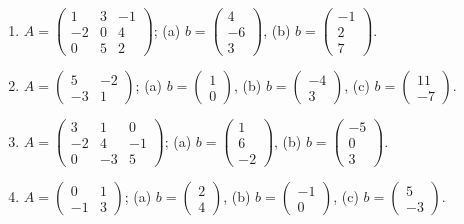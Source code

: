 \begin{enumerate}[label=\arabic*., leftmargin=*]
\item $A=\begin{pmatrix}1&3&-1\\-2&0&4\\0&5&2\end{pmatrix}$; \quad
(a) $b=\begin{pmatrix}4\\-6\\3\end{pmatrix}$, \quad
(b) $b=\begin{pmatrix}-1\\2\\7\end{pmatrix}$.

\item $A=\begin{pmatrix}5&-2\\-3&1\end{pmatrix}$; \quad
(a) $b=\begin{pmatrix}1\\0\end{pmatrix}$, \quad
(b) $b=\begin{pmatrix}-4\\3\end{pmatrix}$, \quad
(c) $b=\begin{pmatrix}11\\-7\end{pmatrix}$.

\item $A=\begin{pmatrix}3&1&0\\-2&4&-1\\0&-3&5\end{pmatrix}$; \quad
(a) $b=\begin{pmatrix}1\\6\\-2\end{pmatrix}$, \quad
(b) $b=\begin{pmatrix}-5\\0\\3\end{pmatrix}$.

\item $A=\begin{pmatrix}0&1\\-1&3\end{pmatrix}$; \quad
(a) $b=\begin{pmatrix}2\\4\end{pmatrix}$, \quad
(b) $b=\begin{pmatrix}-1\\0\end{pmatrix}$, \quad
(c) $b=\begin{pmatrix}5\\-3\end{pmatrix}$.


\end{enumerate}
